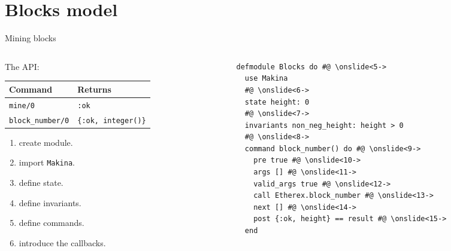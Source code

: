 \documentclass[aspectratio=169, 10pt]{beamer}
\begin{document}
\section{Blocks model}
\label{sec:org78bf112}
\begin{frame}[label={sec:orgf7fffe4},fragile]{Mining blocks}
 \begin{columns}
\begin{column}{0.48\columnwidth}
\onslide<+->
\onslide<+->
The API:
\onslide<+->
\begin{center}
\begin{tabular}{ll}
Command & Returns\\
\hline
\texttt{mine/0} & \texttt{:ok}\\
\texttt{block\_number/0} & \texttt{\{:ok, integer()\}}\\
\end{tabular}
\end{center}
\onslide<+->
\vspace{10pt}
\begin{enumerate}
\item create module.
\onslide<+->
\item import \texttt{Makina}.
\onslide<+->
\item define state.
\onslide<+->
\item define invariants.
\onslide<+->
\item define commands.
\onslide<+->
\item introduce the callbacks.
\end{enumerate}
\end{column}

\begin{column}{0.48\columnwidth}
\lstset{language=elixir,label= ,caption= ,captionpos=b,numbers=none,style=display}
\begin{lstlisting}
defmodule Blocks do #@ \onslide<5->
  use Makina
  #@ \onslide<6->
  state height: 0
  #@ \onslide<7->
  invariants non_neg_height: height > 0
  #@ \onslide<8->
  command block_number() do #@ \onslide<9->
    pre true #@ \onslide<10->
    args [] #@ \onslide<11->
    valid_args true #@ \onslide<12->
    call Etherex.block_number #@ \onslide<13->
    next [] #@ \onslide<14->
    post {:ok, height} == result #@ \onslide<15->
  end
\end{lstlisting}
\end{column}
\end{columns}
\end{frame}
\end{document}
